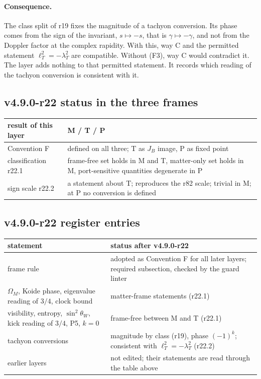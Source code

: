 \paragraph{Consequence.}
The class split of r19 fixes the magnitude of a tachyon conversion.  Its phase comes from the sign of the invariant,
\(s\mapsto-s\), that is \(\gamma\mapsto-\gamma\), and not from the Doppler factor at the complex rapidity.  With this, way C and the
permitted statement \(\ell_T^2=-\lambda_T^2\) are compatible.  Without (F3), way C would contradict it.  The layer adds nothing to
that permitted statement.  It records which reading of the tachyon conversion is consistent with it.

\subsection*{v4.9.0-r22 status in the three frames}
\label{subsec:v490-r22-frames}

\begin{center}
\small
\begin{tabular}{@{}>{\raggedright\arraybackslash}p{}>{\raggedright\arraybackslash}p{}@{}}
\toprule
result of this layer & M / T / P\\
\midrule
Convention F & defined on all three; T as \(J_B\) image, P as fixed point\\
classification r22.1 & frame-free set holds in M and T, matter-only set holds in M, port-sensitive quantities degenerate in P\\
sign scale r22.2 & a statement about T; reproduces the r82 scale; trivial in M; at P no conversion is defined\\
\bottomrule
\end{tabular}
\end{center}

\subsection*{v4.9.0-r22 register entries}
\label{subsec:v490-r22-register}

\begin{center}
\small
\begin{tabular}{@{}>{\raggedright\arraybackslash}p{}>{\raggedright\arraybackslash}p{}@{}}
\toprule
statement & status after v4.9.0-r22\\
\midrule
frame rule & adopted as Convention F for all later layers; required subsection, checked by the guard linter\\
\(\Omega_M\), Koide phase, eigenvalue reading of \(3/4\), clock bound & matter-frame statements (r22.1)\\
visibility, entropy, \(\sin^2\theta_W\), kick reading of \(3/4\), P5, \(k=0\) & frame-free between M and T (r22.1)\\
tachyon conversions & magnitude by class (r19), phase \((-1)^k\); consistent with \(\ell_T^2=-\lambda_T^2\) (r22.2)\\
earlier layers & not edited; their statements are read through the table above\\
\bottomrule
\end{tabular}
\end{center}

